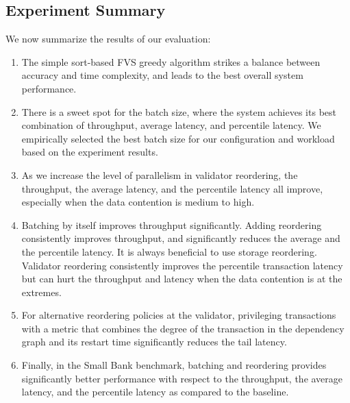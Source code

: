 \subsection{Experiment Summary}

We now summarize the results of our evaluation:
\vspace{-.5em}
\begin{enumerate}
\item The simple sort-based FVS greedy algorithm strikes a balance between accuracy and time complexity, and leads to the best overall system performance. 
\vspace{-.8em}
\item There is a sweet spot for the batch size, where the system achieves its best combination of throughput, average latency, and percentile latency. We empirically selected the best batch size for our configuration and workload based on the experiment results.
\vspace{-.8em}
\item As we increase the level of parallelism in validator reordering, the throughput, the average latency, and the percentile latency all improve, especially when the data contention is medium to high.
\vspace{-.8em}
\item Batching by itself improves throughput significantly. Adding reordering consistently improves throughput, and significantly reduces the average and the percentile latency. It is always beneficial to use storage reordering. Validator reordering consistently improves the percentile transaction latency but can hurt the throughput and latency when the data contention is at the extremes.
\vspace{-.8em}
\item For alternative reordering policies at the validator, privileging transactions with a metric that combines the degree of the transaction in the dependency graph and its restart time significantly reduces the tail latency.
\vspace{-.8em}
\item Finally, in the Small Bank benchmark, batching and reordering provides significantly better performance with respect to the throughput, the average latency, and the percentile latency as compared to the baseline. 
\vspace{-.8em}
\end{enumerate}  
